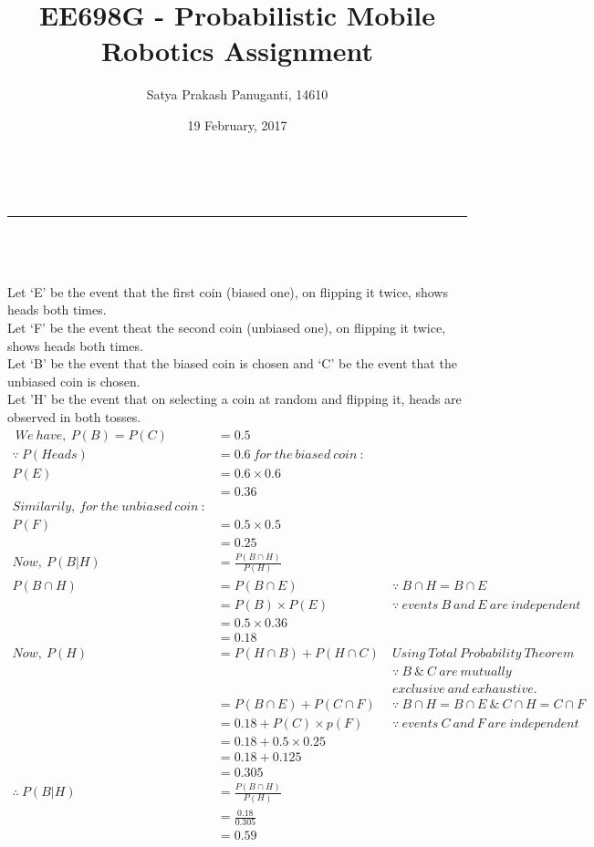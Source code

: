 \documentclass[a4paper,fleqn,11pt]{article}
\makeatletter
\newcommand{\linia}{\rule{\linewidth}{0.5pt}}
\theoremstyle{mytheor}
\renewcommand{\maketitle}{
\begin{center}
\vspace{2ex}
{\huge \textsc{\@title}}
\vspace{1ex}
\\
\linia\\
\@author \hfill \@date
\vspace{4ex}
\end{center}
}
\makeatother
\begin{document}
\title{EE698G - Probabilistic Mobile Robotics Assignment}

\author{Satya Prakash Panuganti, 14610}

\date{19 February, 2017}

\maketitle

\section{}

Let `E' be the event that the first coin (biased one), on flipping it twice, shows heads both times. \\
Let `F' be the event theat the second coin (unbiased one), on flipping it twice, shows heads both times. \\
Let `B' be the event that the biased coin is chosen and `C' be the event that the unbiased coin is chosen. \\
Let 'H' be the event that on selecting a coin at random and flipping it, heads are observed in both tosses.
\begin{align*}
\ We\ have,\ P(B) = P (C) & = 0.5 \\
\because\ P(Heads) & = 0.6\ for\ the\ biased\ coin\ :\\
P (E) & = 0.6 \times 0.6 \\
& = 0.36 \\
Similarily,\ for\ the\ unbiased\ coin\ : \\
P (F) & = 0.5 \times 0.5 \\
& = 0.25 \\
Now,\ P (B | H) & = \frac{P (B \cap H)}{P (H)} \\
P (B \cap H) & = P (B \cap E) & \because\ B \cap H = B \cap E \\
& = P (B) \times P (E) & \because\ events\ B\ and\ E\ are\ independent \\
& = 0.5 \times 0.36 \\
& = 0.18 \\
Now,\ P (H) & = P (H \cap B) + P (H \cap C)\ & Using\ Total\ Probability\ Theorem\ \\
 & & \because\ B\ \&\ C\ are\ mutually \\
 & &  exclusive\ and\ exhaustive. \\
 & = P (B \cap E) + P (C \cap F) & \because\ B \cap H = B \cap E\ \&\ C \cap H = C \cap F\ \\
 & = 0.18 + P (C) \times p (F) & \because\ events\ C\ and\ F\ are\ independent \\
 & = 0.18 + 0.5 \times 0.25 \\\
 & = 0.18 + 0.125 \\
 & = 0.305 \\
 \therefore\ P (B | H) & = \frac{P (B \cap H)}{P (H)} \\
 & = \frac{0.18}{0.305} \\
 & = 0.59
\end{align*}
\end{document}
